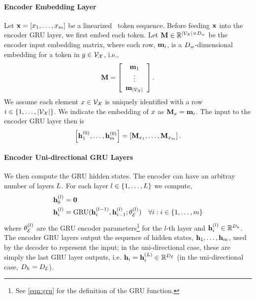 \paragraph{{Encoder Embedding Layer}}
Let $\mathbf{x} = \left[ x_1,\ldots,x_{m}\right]$ be a linearized
\meaningrepresentation~token sequence. Before feeding $\mathbf{x}$ into the
encoder GRU layer, we first embed each token. Let $\mathbf{M} \in
\mathbb{R}^{{\left\vert \mathcal{V}_{\mathcal{X}} \right\vert} \times D_{w}}$ be the encoder input embedding
matrix, where each row, $\mathbf{m}_i$, is a $D_{w}$-dimensional embedding
for a token in $y \in \mathcal{V}_{\mathcal{X}}$, i.e.,
\[ 
    \mathbf{M} = \left[ \begin{array}{c} \mathbf{m}_1\\ \vdots \\ \mathbf{m}_{\left\vert \mathcal{V}_{\mathcal{X}} \right\vert} \end{array}\right]. 
\]
We assume each element $x \in \mathcal{V}_{\mathcal{X}}$ is uniquely identified with a row
$i \in \left\{1, \ldots, {\left\vert \mathcal{V}_{\mathcal{X}} \right\vert}\right\}$. We indicate the
embedding of $x$ as $\mathbf{M}_{x} = \mathbf{m}_i$.  The input to the
encoder GRU layer then is 
\[
\left[\mathbf{h}^{(0)}_1,\ldots,\mathbf{h}^{(0)}_{m}\right] = 
    \left[\mathbf{M}_{x_1},\ldots,   \mathbf{M}_{x_{m}}\right]. 
\]


\paragraph{{Encoder Uni-directional GRU Layers}}
We then compute the GRU hidden states. The encoder can have an arbitray number of layers $L$.
For each layer $l \in \{1,\ldots, L\}$ we compute,
\begin{align*}
    \mathbf{h}_0^{(l)} & = \mathbf{0} \\
    \mathbf{h}_i^{(l)} & =\operatorname{GRU}(\mathbf{h}_i^{(l - 1)}, \mathbf{h}_{i-1}^{(l)}; \theta_\mathcal{E}^{(l)}) & \forall i : i \in \{1,\ldots, m\}
\end{align*}
where $\theta_\mathcal{E}^{(l)}$ are the GRU encoder parameters\footnote{See \autoref{eqn:gru} for the definition of the GRU function.} for the $l$-th layer and $\mathbf{h}^{(l)}_i \in \mathbb{R}^{D_{h}}$. The encoder GRU layers output the 
sequence of hidden states, $\mathbf{h}_1,\ldots,\mathbf{h}_{m}$, used by the decoder to represent the input; 
in the uni-directional case, these are simply the last GRU layer outputs, i.e. $\mathbf{h}_i = \mathbf{h}_i^{(L)} \in \mathbb{R}^{{D_\mathcal{E}}}$ (in the uni-directional case, $D_{h} = {D_\mathcal{E}}$).

